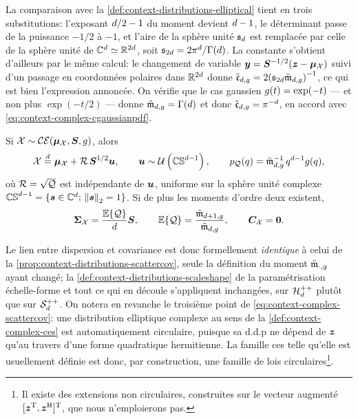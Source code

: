\begin{remark}
  La comparaison avec la \cref{def:context-distributions-elliptical} tient en trois substitutions: l'exposant $d/2-1$ du moment devient $d-1$, le déterminant passe de la puissance $-1/2$ à $-1$, et l'aire de la sphère unité $\mathfrak{s}_{d}$ est remplacée par celle de la sphère unité de $\mathbb{C}^d\simeq\mathbb{R}^{2d}$, soit $\mathfrak{s}_{2d}=2\pi^d/\Gamma(d)$. La constante s'obtient d'ailleurs par le même calcul: le changement de variable $\boldsymbol{y}=\boldsymbol{S}^{-1/2}(\boldsymbol{z}-\boldsymbol{\mu}_{\mathcal{X}})$ suivi d'un passage en coordonnées polaires dans $\mathbb{R}^{2d}$ donne $\tilde{\mathfrak{c}}_{d,g} = 2{\left(\mathfrak{s}_{2d}\tilde{\mathfrak{m}}_{d,g}\right)}^{-1}$, ce qui est bien l'expression annoncée. On vérifie que le cas gaussien $g(t)=\exp(-t)$ — et non plus $\exp(-t/2)$ — donne $\tilde{\mathfrak{m}}_{d,g}=\Gamma(d)$ et donc $\tilde{\mathfrak{c}}_{d,g}=\pi^{-d}$, en accord avec \cref{eq:context-complex-cgaussianpdf}.
\end{remark}

\begin{property}
\label{prop:context-complex-stochastic}
  Si $\mathcal{X}\sim\mathcal{CE}(\boldsymbol{\mu}_{\mathcal{X}},\boldsymbol{S},g)$, alors
  \begin{equation}
    \mathcal{X} \overset{d}{=} \boldsymbol{\mu}_{\mathcal{X}} + \mathcal{R}\,\boldsymbol{S}^{1/2}\boldsymbol{u},
    \qquad
    \boldsymbol{u}\sim\mathcal{U}\left(\mathbb{CS}^{d-1}\right),
    \qquad
    p_{\mathcal{Q}}(q) = {\tilde{\mathfrak{m}}_{d,g}}^{-1}\,q^{d-1}g(q),
    \label{eq:context-complex-stochastic}
  \end{equation}
  où $\mathcal{R}=\sqrt{\mathcal{Q}}$ est indépendante de $\boldsymbol{u}$, uniforme sur la sphère unité complexe $\mathbb{CS}^{d-1}=\{\boldsymbol{s}\in\mathbb{C}^d;\,\left\lVert\boldsymbol{s}\right\rVert_2=1\}$. Si de plus les moments d'ordre deux existent,
  \begin{equation}
    \boldsymbol{\Sigma}_{\mathcal{X}} = \frac{\operatorname{\mathbb{E}}\{\mathcal{Q}\}}{d}\boldsymbol{S},
    \qquad
    \operatorname{\mathbb{E}}\{\mathcal{Q}\} = \frac{\tilde{\mathfrak{m}}_{d+1,g}}{\tilde{\mathfrak{m}}_{d,g}},
    \qquad
    \boldsymbol{C}_{\mathcal{X}} = \boldsymbol{0}.
    \label{eq:context-complex-scattercov}
  \end{equation}
\end{property}

  Le lien entre dispersion et covariance est donc formellement \emph{identique} à celui de la \cref{prop:context-distributions-scattercov}, seule la définition du moment $\tilde{\mathfrak{m}}_{\cdot,g}$ ayant changé; la \cref{def:context-distributions-scaleshape} de la paramétrisation échelle-forme et tout ce qui en découle s'appliquent inchangées, sur $\mathcal{H}_{d}^{++}$ plutôt que sur $\mathcal{S}_{d}^{++}$. On notera en revanche le troisième point de \cref{eq:context-complex-scattercov}: une distribution elliptique complexe au sens de la \cref{def:context-complex-ces} est automatiquement circulaire, puisque sa d.d.p ne dépend de $\boldsymbol{z}$ qu'au travers d'une forme quadratique hermitienne. La famille ces telle qu'elle est usuellement définie \cite{6263313} est donc, par construction, une famille de lois circulaires\footnote{Il existe des extensions non circulaires, construites sur le vecteur augmenté $[\boldsymbol{z}^{\mathrm{T}},\boldsymbol{z}^{\mathrm{H}}]^{\mathrm{T}}$, que nous n'emploierons pas.}.


